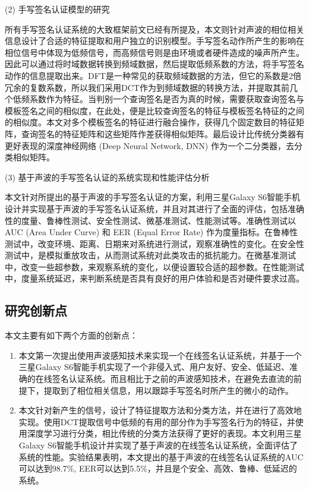 (2) 手写签名认证模型的研究

所有手写签名认证系统的大致框架前文已经有所提及，本文则针对声波的相位相关信息设计了合适的特征提取和用户独立的识别模型。手写签名动作所产生的影响在相位信号中体现为低频信号，而高频信号则是由环境或者硬件造成的噪声所产生。因此可以通过将时域数据转换到频域数据，然后提取低频系数的方法，将手写签名动作的信息提取出来。DFT是一种常见的获取频域数据的方法，但它的系数是2倍冗余的复数系数，所以我们采用DCT作为到频域数据的转换方法，并提取其前几个低频系数作为特征。当判别一个查询签名是否为真的时候，需要获取查询签名与模板签名之间的相似度，在此处，便是比较查询签名的特征与模板签名特征的之间的相似度。本文对多个模板签名的特征进行融合操作，获得几个固定数目的特征矩阵，查询签名的特征矩阵和这些矩阵作差获得相似矩阵。最后设计比传统分类器有更好表现的深度神经网络 (Deep Neural Network, DNN)\cite{Schmidhuber2015Deep} 作为一个二分类器，去分类相似矩阵。

(3) 基于声波的手写签名认证的系统实现和性能评估分析

本文针对所提出的基于声波的手写签名认证的方案，利用三星Galaxy S6智能手机设计并实现基于声波的手写签名认证系统，并且对其进行了全面的评估，包括准确性的度量、鲁棒性测试、安全性测试、微基准测试、性能测试等。准确性测试以 AUC (Area Under Curve) 和 EER (Equal Error Rate) 作为度量指标。在鲁棒性测试中，改变环境、距离、日期来对系统进行测试，观察准确性的变化。在安全性测试中，是模拟重放攻击，从而测试系统对此类攻击的抵抗能力。在微基准测试中，改变一些超参数，来观察系统的变化，以便设置较合适的超参数。在性能测试中，度量系统延迟，来判断系统是否具有良好的用户体验和是否对硬件要求过高。


\subsection{研究创新点}

本文主要有如下两个方面的创新点：
\begin{enumerate}[label=(\arabic*)]
    \item 本文第一次提出使用声波感知技术来实现一个在线签名认证系统，并基于一个三星Galaxy S6智能手机实现了一个非侵入式、用户友好、安全、低延迟、准确的在线签名认证系统。而且相比于之前的声波感知技术，在避免去直流的前提下，提取到了相位相关信息，用以跟踪手写签名时所产生的微小的动作。

    \item 本文针对新产生的信号，设计了特征提取方法和分类方法，并在进行了高效地实现。使用DCT提取信号中低频的有用的部分作为手写签名行为的特征，并使用深度学习进行分类，相比传统的分类方法获得了更好的表现。本文利用三星Galaxy S6智能手机设计并实现了基于声波的在线签名认证系统，全面评估了系统的性能。实验结果表明，本文提出的基于声波的在线签名认证系统的AUC可以达到98.7\%, EER可以达到5.5\%，并且是个安全、高效、鲁棒、低延迟的系统。
\end{enumerate}

